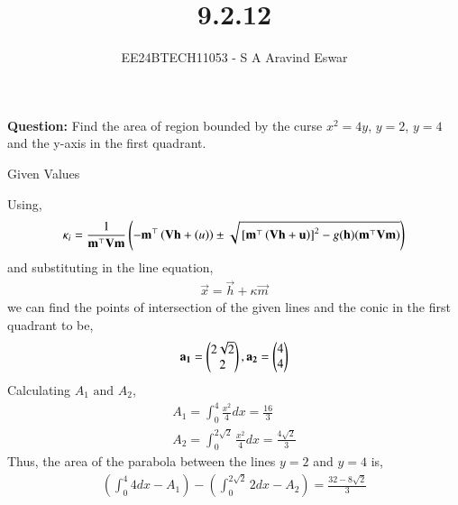 \documentclass[journal]{IEEEtran}
\begin{document}

\vspace{3cm}

\title{9.2.12}
\author{EE24BTECH11053 - S A Aravind Eswar}
{\let\newpage\relax\maketitle}

\renewcommand{\thefigure}{\theenumi}
\renewcommand{\thetable}{\theenumi}
\setlength{\intextsep}{10pt} %


\renewcommand{\thetable}{\theenumi}

\textbf{Question: } Find the area of region bounded by the curse $x^2 = 4y$,  $y=2$, $y=4$ and the y-axis in the first quadrant. 

\solution
\begin{table}[h]
    \centering
    
    \caption{Given Values}
    \label{tab:1}
\end{table}

Using,
\begin{align}
    \kappa_i = \frac{1}{\mathbf{m}^\top\mathbf{V}\mathbf{m}}\left(-\mathbf{m}^\top\left(\mathbf{Vh}+\left(u\right)\right)\pm \sqrt{{}\left[\mathbf{m}^\top\left(\mathbf{Vh}+\mathbf{u}\right)\right]^2 - g(\mathbf{h})(\mathbf{m}^\top\mathbf{Vm})}\right)
\end{align}
and substituting in the line equation,
\begin{align}
    \vec{x} = \vec{h} + \kappa\vec{m}
\end{align}
we can find the points of intersection of the given lines and the conic in the first quadrant to be,
\begin{align}
    \mathbf{a_1} = \begin{pmatrix}2\sqrt{2}\\2\end{pmatrix}, \mathbf{a_2} = \begin{pmatrix}4\\4\end{pmatrix}
\end{align}
Calculating $A_1 \text{ and } A_2$,
\begin{align}
    A_1 = \int_{0}^{4} \frac{x^2}{4} dx = \frac{16}{3}\\
    A_2 = \int_{0}^{2\sqrt{2}} \frac{x^2}{4} dx = \frac{4\sqrt{2}}{3}
\end{align}
Thus, the area of the parabola between the lines $y = 2$ and $y = 4$ is,
\begin{align}
    (\int_{0}^{4} 4 dx - A_1) - (\int_{0}^{2\sqrt{2}} 2 dx - A_2) = \frac{32 - 8\sqrt{2}}{3}
\end{align}
\end{document}

